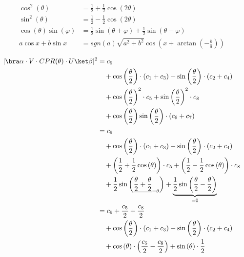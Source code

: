 \begin{equation}
    \begin{split}
        \cos^2\left(\theta\right) &= \frac12 + \frac12 \cos\left(2\theta\right) \\
        \sin^2\left(\theta\right) &= \frac12 - \frac12 \cos\left(2\theta\right) \\
        \cos\left(\theta\right)\sin\left(\varphi\right) &= \frac12\sin\left(\theta + \varphi\right) + \frac12 \sin\left(\theta - \varphi\right) \\
        a\cos x + b \sin x &= sgn(a) \sqrt{a^2 + b^2} \cos\left(x + \arctan\left(-\frac ba\right)\right)
    \end{split}
\end{equation}

\begin{equation}
    \label{eq:single-prob-simplified-simplified}
    \begin{split}
        \lvert \bra\alpha \cdot V \cdot CPR(\theta) \cdot U \ket\beta \rvert^2
            &= c_9 \\
                &\quad + \cos\left(\frac\theta2\right) \cdot \left(c_1 + c_3\right) + \sin\left(\frac\theta2\right) \cdot \left(c_2 + c_4\right) \\
                &\quad + \cos\left(\frac\theta2\right)^2 \cdot c_5 + \sin\left(\frac\theta2\right)^2 \cdot c_8 \\
                &\quad + \cos\left(\frac\theta2\right)\sin\left(\frac\theta2\right) \cdot \left(c_6 + c_7\right) \\
            &= c_9 \\
                &\quad + \cos\left(\frac\theta2\right) \cdot \left(c_1 + c_3\right) + \sin\left(\frac\theta2\right) \cdot \left(c_2 + c_4\right) \\
                &\quad + \left(\frac12 + \frac12 \cos\left(\theta\right)\right) \cdot c_5 + \left(\frac12 - \frac12 \cos\left(\theta\right)\right) \cdot c_8 \\
                &\quad + \frac12 \sin\left(\underline{\frac\theta2 + \frac\theta2}_{=\theta}\right) + \underbrace{\frac12 \sin\left(\frac\theta2 - \frac\theta2\right)}_{= 0} \\
            &= c_9 + \frac{c_5}{2} + \frac{c_8}{2} \\
                &\quad + \cos\left(\frac\theta2\right) \cdot \left(c_1 + c_3\right) + \sin\left(\frac\theta2\right) \cdot \left(c_2 + c_4\right) \\
                &\quad + \cos\left(\theta\right) \cdot \left(\frac{c_5}{2} - \frac{c_8}{2}\right) + \sin\left(\theta\right) \cdot \frac12 \\

\end{split}
\end{equation}
